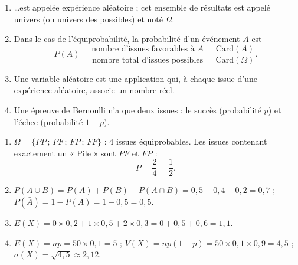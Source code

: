 \documentclass[11pt]{article}
\newcommand{\cle}[1]{{\popxbold\color{popdark}#1}}
\begin{document}
\begin{corrige}
\begin{enumerate}
\item \ldots est appelée \cle{expérience aléatoire} ; cet ensemble de résultats est appelé \cle{univers} (ou univers des possibles) et noté \cle{$\Omega$}.
\item Dans le cas de l'\cle{équiprobabilité}, la probabilité d'un événement $A$ est
\[P(A)=\dfrac{\text{nombre d'issues favorables à } A}{\text{nombre total d'issues possibles}}=\dfrac{\text{Card}(A)}{\text{Card}(\Omega)}.\]
\item Une \cle{variable aléatoire} est une application qui, à chaque issue d'une expérience aléatoire, associe un nombre réel.
\item Une épreuve de Bernoulli n'a que \cle{deux} issues : le \cle{succès} (probabilité $p$) et l'\cle{échec} (probabilité $1-p$).
\end{enumerate}
\end{corrige}

\begin{corrige}
\begin{enumerate}
\item $\Omega=\{PP\,;\,PF\,;\,FP\,;\,FF\}$ : 4 issues équiprobables. Les issues contenant exactement un « Pile » sont $PF$ et $FP$ :
\[P=\dfrac{2}{4}=\dfrac{1}{2}.\]
\item $P(A\cup B)=P(A)+P(B)-P(A\cap B)=0{,}5+0{,}4-0{,}2=0{,}7$ ; \quad $P(\bar{A})=1-P(A)=1-0{,}5=0{,}5$.
\item $E(X)=0\times 0{,}2+1\times 0{,}5+2\times 0{,}3=0+0{,}5+0{,}6=1{,}1$.
\item $E(X)=np=50\times 0{,}1=5$ ; \quad $V(X)=np(1-p)=50\times 0{,}1\times 0{,}9=4{,}5$ ; \quad $\sigma(X)=\sqrt{4{,}5}\approx 2{,}12$.
\end{enumerate}
\end{corrige}
\end{document}
